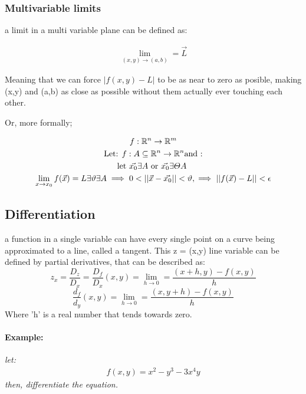 \documentclass[11pt,fleqn]{book} %
\begin{document}
\subsubsection{Multivariable limits}

a limit in a multi variable plane can be defined as: 

\begin{gather}
    \lim_{(x,y) \to (a,b)} = \vec{L}
\end{gather}

Meaning that we can force $ |f(x,y)-L|$ to be as near to zero as posible, making
(x,y) and (a,b) as close as possible without them actually ever touching each other.

Or, more formally;

\begin{gather}
    f: \mathbb{R}^n \to \mathbb{R}^m \\
    \text{Let: } f: A \subseteq \mathbb{R}^n \rightarrow \mathbb{R}^n \text{and :}\\
    \text{let $ \vec{x_0} \exists A $ or $ \vec{x_0} \exists \varTheta A $ }\\
    \lim_{x \to x_0} f(\vec{x}) = L \exists \vartheta \exists A \implies 0 < ||\vec{x} - \vec{x_0}|| < \vartheta, \implies ||f(\vec{x})-L||<\epsilon
\end{gather}

\subsection{Differentiation}

a function in a single variable can have every single point on a curve being approximated to
a line, called a tangent. This z = (x,y) line variable can be defined by partial derivatives, that
can be described as:
\begin{equation}
    z_x = \frac{D_z}{D_x} = \frac{D_f}{D_x} (x,y) = \lim_{h \to 0} = \frac{(x+h,y)-f(x,y)}{h} 
\end{equation}
\begin{equation}
    \frac{d_f}{d_y}(x,y) = \lim_{h \to 0} = \frac{(x,y+h)-f(x,y)}{h}
\end{equation}
Where 'h' is a real number that tends towards zero.

\paragraph*{Example: }
\textit{let: }
\begin{gather}
    f(x,y) = x^2-y^3 - 3x^4y
\end{gather}
\textit{then, differentiate the equation.}
\end{document}
